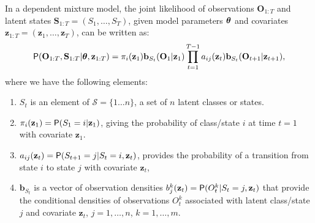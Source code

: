 \documentclass[article]{jss}
\newcommand{\vc}{\mathbf}
\newcommand{\greekv}[1]{\mbox{\boldmath$\mathrm{#1}$}}
\begin{document}
In a dependent mixture model, the joint likelihood of observations
$\vc{O}_{1:T}$ and latent states $\vc{S}_{1:T} = (S_1,\ldots,S_T)$,
given model parameters $\greekv{\theta}$ and covariates $\vc{z}_{1:T}
= (\vc{z}_1,\ldots,\vc{z}_T)$, can be written as:
\begin{equation}
	\Prob(\vc{O}_{1:T},\vc{S}_{1:T}|\greekv{\theta},\vc{z}_{1:T}) =  
	\pi_{i}(\vc{z}_1) \vc{b}_{S_t}(\vc{O}_1|\vc{z}_{1})
	\prod_{t=1}^{T-1} a_{ij}(\vc{z}_{t}) \vc{b}_{S_t}(\vc{O}_{t+1}|\vc{z}_{t+1}),
\end{equation}
where we have the following elements:
\begin{enumerate}
	
	\item $S_{t}$ is an element of $\mathcal{S}=\{1\ldots n\}$, a set
	of $n$ latent classes or states.
	
	\item $\pi_{i}(\vc{z}_1) = \Prob(S_1 = i|\vc{z}_1)$, giving the
	probability of class/state $i$ at time $t=1$ with covariate
	$\vc{z}_1$.
	
	\item $a_{ij}(\vc{z}_t) = \Prob(S_{t+1}=j|S_{t}=i,\vc{z}_t)$,
	provides the probability of a transition from state $i$ to state
	$j$ with covariate $\vc{z}_t$,
	
	\item $\vc{b}_{S_t}$ is a vector of observation densities
	$b_{j}^k(\vc{z}_t) = \Prob(O_{t}^k|S_t = j, \vc{z}_t)$ that
	provide the conditional densities of observations $O_{t}^k$
	associated with latent class/state $j$ and covariate $\vc{z}_t$,
	$j=1, \ldots, n$, $k=1, \ldots, m$.
	
\end{enumerate}

\end{document}
